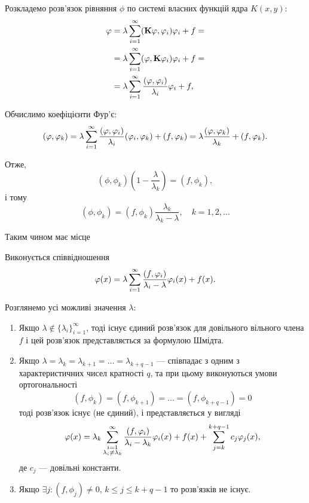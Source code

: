 Розкладемо розв'язок рівняння $\phi$ по системі власних функцій ядра $K(x, y)$:
\begin{equation}
	\begin{aligned}
		\varphi &= \lambda \displaystyle\sum\limits_{i = 1}^\infty (\textbf{K}\varphi, \varphi_i) \varphi_i + f = \\
		&= \lambda \displaystyle\sum\limits_{i = 1}^\infty (\varphi, \textbf{K} \varphi_i) \varphi_i + f = \\
		&= \lambda \displaystyle\sum\limits_{i = 1}^\infty \dfrac{(\varphi, \varphi_i)}{\lambda_i} \varphi_i + f,
	\end{aligned}
\end{equation}

Обчислимо коефіцієнти Фур'є:
\begin{equation}
	(\varphi, \varphi_k) = \lambda \displaystyle\sum\limits_{i = 1}^\infty \dfrac{(\varphi, \varphi_i)}{\lambda_i} (\varphi_i, \varphi_k) + (f, \varphi_k) = \lambda \dfrac{(\varphi, \varphi_k)}{\lambda_k} + (f, \varphi_k).
\end{equation}

Отже,
\begin{equation}
	(\phi, \phi_k) \left(1 - \frac{\lambda}{\lambda_k}\right) = (f, \phi_k),
\end{equation}
і тому
\begin{equation}
	(\phi, \phi_k) = (f, \phi_k) \frac{\lambda_k}{\lambda_k - \lambda}, \quad k = 1, 2, \ldots
\end{equation}

Таким чином має місце 
\begin{theorem}
	Виконується співвідношення
	\begin{equation}
		\varphi(x) = \lambda \displaystyle\sum\limits_{i = 1}^\infty \dfrac{(f, \varphi_i)}{\lambda_i - \lambda} \varphi_i(x) + f(x).
	\end{equation}
\end{theorem}

Розглянемо усі можливі значення $\lambda$:
\begin{enumerate}
	\item Якщо $\lambda \notin \{\lambda_i\}_{i=1}^\infty$, тоді існує єдиний розв'язок для довільного вільного члена $f$ і цей розв'язок представляється за формулою Шмідта.
	
	\item Якщо $\lambda = \lambda_k = \lambda_{k + 1} = \ldots = \lambda_{k + q - 1}$ --- співпадає з одним з характеристичних чисел кратності $q$, та при цьому виконуються умови ортогональності
	\begin{equation}
		(f, \phi_k) = (f, \phi_{k + 1}) = \ldots = (f, \phi_{k + q - 1}) = 0
	\end{equation}
	тоді розв'язок існує (не єдиний), і представляється у вигляді 
	\begin{equation}
		\varphi(x) = \lambda_k \displaystyle\sum\limits_{\substack{i = 1 \\ \lambda_i \ne \lambda_k}}^\infty \dfrac{(f, \varphi_i)}{\lambda_i - \lambda_k} \varphi_i(x) + f(x) + \displaystyle\sum\limits_{j = k}^{k + q - 1} c_j \varphi_j(x),
	\end{equation}
	де $c_j$ --- довільні константи.

	\item Якщо $\exists j: (f, \phi_j) \ne 0$, $k \le j \le k + q - 1$ то розв'язків не існує.
\end{enumerate}

